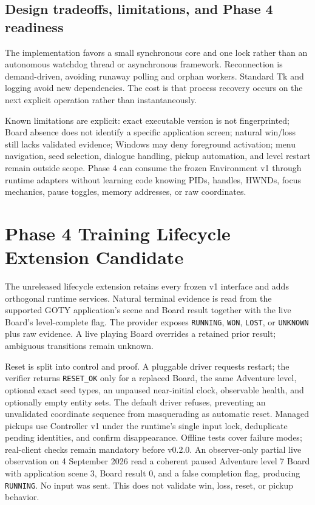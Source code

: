 \documentclass[11pt,a4paper]{article}
\begin{document}
\subsection{Design tradeoffs, limitations, and Phase 4 readiness}
The implementation favors a small synchronous core and one lock rather than an autonomous watchdog thread or asynchronous framework. Reconnection is demand-driven, avoiding runaway polling and orphan workers. Standard Tk and logging avoid new dependencies. The cost is that process recovery occurs on the next explicit operation rather than instantaneously.

Known limitations are explicit: exact executable version is not fingerprinted; Board absence does not identify a specific application screen; natural win/loss still lacks validated evidence; Windows may deny foreground activation; menu navigation, seed selection, dialogue handling, pickup automation, and level restart remain outside scope. Phase 4 can consume the frozen Environment v1 through runtime adapters without learning code knowing PIDs, handles, HWNDs, focus mechanics, pause toggles, memory addresses, or raw coordinates.

\section{Phase 4 Training Lifecycle Extension Candidate}
The unreleased lifecycle extension retains every frozen v1 interface and adds
orthogonal runtime services. Natural terminal evidence is read from the
supported GOTY application's scene and Board result together with the live
Board's level-complete flag. The provider exposes \texttt{RUNNING},
\texttt{WON}, \texttt{LOST}, or \texttt{UNKNOWN} plus raw evidence. A live
playing Board overrides a retained prior result; ambiguous transitions remain
unknown.

Reset is split into control and proof. A pluggable driver requests restart;
the verifier returns \texttt{RESET\_OK} only for a replaced Board, the same
Adventure level, optional exact seed types, an unpaused near-initial clock,
observable health, and optionally empty entity sets. The default driver
refuses, preventing an unvalidated coordinate sequence from masquerading as
automatic reset. Managed pickups use Controller v1 under the runtime's single
input lock, deduplicate pending identities, and confirm disappearance. Offline
tests cover failure modes; real-client checks remain mandatory before v0.2.0.
An observer-only partial live observation on 4 September 2026 read a coherent
paused Adventure level 7 Board with application scene 3, Board result 0, and a
false completion flag, producing \texttt{RUNNING}. No input was sent. This does
not validate win, loss, reset, or pickup behavior.
\end{document}
